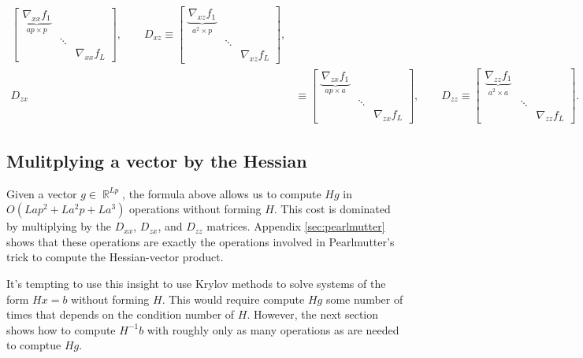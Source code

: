 \documentclass{article}
\newcommand{\R}{\mathop{\mathbb{R}}}
\begin{document}
\begin{align*}
  \begin{bmatrix}
    \underbrace{\nabla_{xx} f_1}_{ap\times p} &        &                 \\
    & \ddots &                 \\
    &        & \nabla_{xx} f_L
  \end{bmatrix}
  , \qquad
  D_{xz} \equiv
  \begin{bmatrix}
    \underbrace{\nabla_{xz} f_1}_{a^2 \times p} &        &                 \\
    & \ddots &                 \\
    &        & \nabla_{xz} f_L
  \end{bmatrix}
  ,                                                                                                \\
  D_{zx} & \equiv
  \begin{bmatrix}
    \underbrace{\nabla_{zx} f_1}_{ap \times a} &        &                 \\
    & \ddots &                 \\
    &        & \nabla_{zx} f_L
  \end{bmatrix}
  ,
  \qquad
  D_{zz}  \equiv
  \begin{bmatrix}
    \underbrace{\nabla_{zz} f_1}_{a^2\times a} &        &                 \\
    & \ddots &                 \\
    &        & \nabla_{zz} f_L
  \end{bmatrix}
  .
\end{align*}

\subsection{Mulitplying a vector by the Hessian}

Given a vector $g \in \R^{Lp}$, the formula above allows us to compute $H g$ in $O\left(Lap^2 + L a^2p +La^3\right)$
operations without forming $H$. This cost is dominated by multiplying by the $D_{xx}$, $D_{zx}$, and $D_{zz}$ matrices.
Appendix \ref{sec:pearlmutter} shows that these operations are exactly the operations involved in Pearlmutter's trick
to compute the Hessian-vector product.

It's tempting to use this insight to use Krylov methods to solve systems of the form $H x = b$ without forming $H$.
This would require compute $H g$ some number of times that depends on the condition number of $H$. However, the next
section shows how to compute $H^{-1} b$ with roughly only as many operations as are needed to comptue $H g$.
\end{document}
